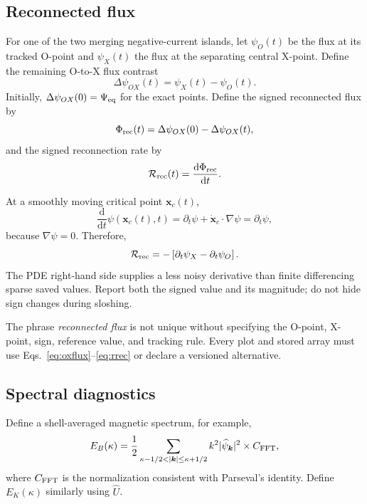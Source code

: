 \documentclass[11pt]{article}
\newcommand{\dd}{\mathrm{d}}
\newcommand{\pd}{\partial}
\newcommand{\vect}[1]{\bm{#1}}
\begin{document}
\subsection{Reconnected flux}

For one of the two merging negative-current islands, let $\psi_O(t)$ be the flux at its tracked O-point and $\psi_X(t)$ the flux at the separating central X-point. Define the remaining O-to-X flux contrast
\begin{equation}
\Delta\psi_{OX}(t)=\psi_X(t)-\psi_O(t).
\label{eq:oxflux}
\end{equation}
Initially, $\Delta\psi_{OX}(0)=\Psi_{\rm eq}$ for the exact points. Define the signed reconnected flux by
\begin{equation}
\Phi_{\rm rec}(t)
=\Delta\psi_{OX}(0)-\Delta\psi_{OX}(t),
\label{eq:phirec}
\end{equation}
and the signed reconnection rate by
\begin{equation}
\mathcal{R}_{\rm rec}(t)
=\frac{\dd\Phi_{\rm rec}}{\dd t}.
\label{eq:rrec}
\end{equation}

At a smoothly moving critical point $\vect{x}_c(t)$,
\begin{equation}
\frac{\dd}{\dd t}\psi(\vect{x}_c(t),t)
=\pd_t\psi+\dot{\vect{x}}_c\cdot\nabla\psi
=\pd_t\psi,
\end{equation}
because $\nabla\psi=0$. Therefore,
\begin{equation}
\mathcal{R}_{\rm rec}
=-\left[\pd_t\psi_X-\pd_t\psi_O\right].
\end{equation}
The PDE right-hand side supplies a less noisy derivative than finite differencing sparse saved values. Report both the signed value and its magnitude; do not hide sign changes during sloshing.

\begin{warningbox}[\,: definition]
The phrase \emph{reconnected flux} is not unique without specifying the O-point, X-point, sign, reference value, and tracking rule. Every plot and stored array must use Eqs.~\eqref{eq:oxflux}--\eqref{eq:rrec} or declare a versioned alternative.
\end{warningbox}

\subsection{Spectral diagnostics}

Define a shell-averaged magnetic spectrum, for example,
\begin{equation}
E_B(\kappa)
=\frac12
\sum_{\kappa-1/2<|\vect{k}|\le\kappa+1/2}
k^2|\widehat\psi_{\vect{k}}|^2
\times C_{\rm FFT},
\end{equation}
where $C_{\rm FFT}$ is the normalization consistent with Parseval's identity. Define $E_K(\kappa)$ similarly using $\widehat U$.
\end{document}
